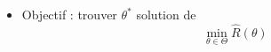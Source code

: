 \documentclass[c]{beamer}
\begin{document}
\begin{frame}
\begin{columns}
\begin{column}{.4\textwidth}
\begin{figure}
{      }
  \end{figure}
    \end{column}
  \end{columns}
  \begin{itemize}
    \item<5-> Objectif : trouver $\theta^*$ solution de
      \[
        \min_{\theta \in \Theta} \hat{R}\left( \theta \right)
      \]
  \end{itemize}

\end{frame}
\end{document}
